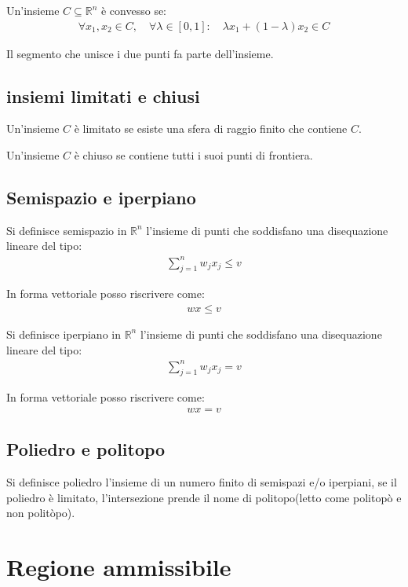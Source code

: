 Un'insieme $C \subseteq \mathbb{R}^n$ è convesso se:
\begin{align}
	\forall x_1, x_2 \in C, \quad \forall \lambda \in [0,1] : \quad \lambda x_1 + (1-\lambda) x_2 \in C
\end{align}

Il segmento che unisce i due punti fa parte dell'insieme.

\subsection{insiemi limitati e chiusi}

Un'insieme $C$ è limitato se esiste una sfera di raggio finito che contiene $C$.


Un'insieme $C$ è chiuso se contiene tutti i suoi punti di frontiera.

\subsection{Semispazio e iperpiano}

Si definisce semispazio in $\mathbb{R}^n$ l'insieme di punti che soddisfano una disequazione lineare del tipo:
\begin{align}
	\sum_{j=1}^n w_j x_j \leq v
\end{align}

In forma vettoriale posso riscrivere come:
\begin{align}
	wx \leq v
\end{align}


Si definisce iperpiano in $\mathbb{R}^n$ l'insieme di punti che soddisfano una disequazione lineare del tipo:
\begin{align}
	\sum_{j=1}^n w_j x_j = v
\end{align}

In forma vettoriale posso riscrivere come:
\begin{align}
	wx = v
\end{align}


\subsection{Poliedro e politopo}

Si definisce poliedro l'insieme di un numero finito di semispazi e/o iperpiani, se il poliedro è limitato, l'intersezione prende il nome di politopo(letto come politopò e non politòpo).



\section{Regione ammissibile}

